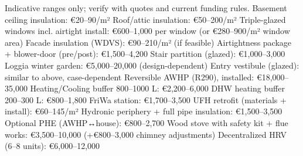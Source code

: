 \markdownRendererDocumentBegin
\markdownRendererSectionBegin
{}\markdownRendererInterblockSeparator
{}Indicative ranges only; verify with quotes and current funding rules.\markdownRendererInterblockSeparator
{}\markdownRendererSectionBegin
{}\markdownRendererInterblockSeparator
{}\markdownRendererUlBeginTight
\markdownRendererUlItem Basement ceiling insulation: €20–90/m²\markdownRendererUlItemEnd 
\markdownRendererUlItem Roof/attic insulation: €50–200/m²\markdownRendererUlItemEnd 
\markdownRendererUlItem Triple-glazed windows incl. airtight install: €600–1,000 per window (or €280–900/m² window area)\markdownRendererUlItemEnd 
\markdownRendererUlItem Facade insulation (WDVS): €90–210/m² (if feasible)\markdownRendererUlItemEnd 
\markdownRendererUlItem Airtightness package + blower-door (pre/post): €1,500–4,200\markdownRendererUlItemEnd 
\markdownRendererUlItem Stair partition (glazed): €1,000–3,000\markdownRendererUlItemEnd 
\markdownRendererUlItem Loggia winter garden: €5,000–20,000 (design-dependent)\markdownRendererUlItemEnd 
\markdownRendererUlItem Entry vestibule (glazed): similar to above, case-dependent\markdownRendererUlItemEnd 
\markdownRendererUlEndTight \markdownRendererInterblockSeparator
{}
\markdownRendererSectionEnd \markdownRendererSectionBegin
{}\markdownRendererInterblockSeparator
{}\markdownRendererUlBeginTight
\markdownRendererUlItem Reversible AWHP (R290), installed: €18,000–35,000\markdownRendererUlItemEnd 
\markdownRendererUlItem Heating/Cooling buffer 800–1000 L: €2,200–6,000\markdownRendererUlItemEnd 
\markdownRendererUlItem DHW heating buffer 200–300 L: €800–1,800\markdownRendererUlItemEnd 
\markdownRendererUlItem FriWa station: €1,700–3,500\markdownRendererUlItemEnd 
\markdownRendererUlItem UFH retrofit (materials + install): €60–145/m²\markdownRendererUlItemEnd 
\markdownRendererUlItem Hydronic periphery + full pipe insulation: €1,500–3,500\markdownRendererUlItemEnd 
\markdownRendererUlItem Optional PHE (AWHP↔house): €800–2,700\markdownRendererUlItemEnd 
\markdownRendererUlItem Wood stove with safety kit + flue works: €3,500–10,000 (+€800–3,000 chimney adjustments)\markdownRendererUlItemEnd 
\markdownRendererUlEndTight \markdownRendererInterblockSeparator
{}
\markdownRendererSectionEnd \markdownRendererSectionBegin
{}\markdownRendererInterblockSeparator
{}\markdownRendererUlBeginTight
\markdownRendererUlItem Decentralized HRV (6–8 units): €6,000–12,000\markdownRendererUlItemEnd 
